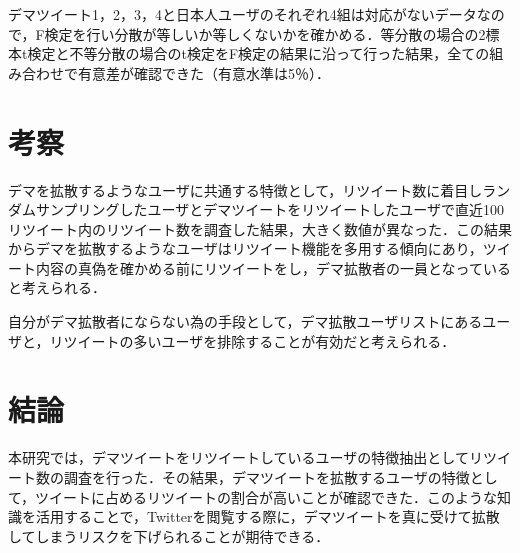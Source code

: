 \documentclass[uplatex,twocolumn,dvipdfmx]{jsarticle}
\begin{document}
デマツイート1，2，3，4と日本人ユーザのそれぞれ4組は対応がないデータなので，F検定を行い分散が等しいか等しくないかを確かめる．等分散の場合の2標本t検定と不等分散の場合のt検定をF検定の結果に沿って行った結果，全ての組み合わせで有意差が確認できた（有意水準は5％）．

\section{考察}
デマを拡散するようなユーザに共通する特徴として，リツイート数に着目しランダムサンプリングしたユーザとデマツイートをリツイートしたユーザで直近100リツイート内のリツイート数を調査した結果，大きく数値が異なった．この結果からデマを拡散するようなユーザはリツイート機能を多用する傾向にあり，ツイート内容の真偽を確かめる前にリツイートをし，デマ拡散者の一員となっていると考えられる．

自分がデマ拡散者にならない為の手段として，デマ拡散ユーザリストにあるユーザと，リツイートの多いユーザを排除することが有効だと考えられる．

\section{結論}
本研究では，デマツイートをリツイートしているユーザの特徴抽出としてリツイート数の調査を行った．その結果，デマツイートを拡散するユーザの特徴として，ツイートに占めるリツイートの割合が高いことが確認できた．このような知識を活用することで，Twitterを閲覧する際に，デマツイートを真に受けて拡散してしまうリスクを下げられることが期待できる．


\end{document}
